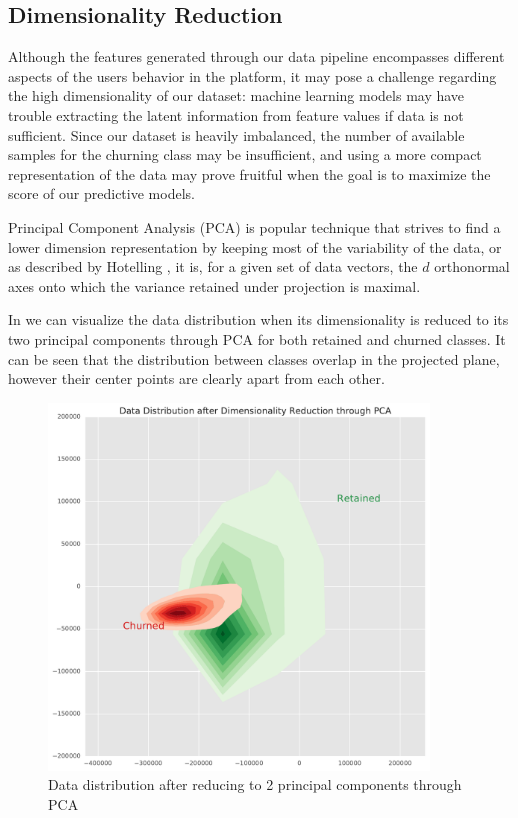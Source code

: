 \documentclass{kththesis}
\begin{document}
\subsection{Dimensionality Reduction}

Although the features generated through our data pipeline encompasses different aspects of the users behavior in the platform, it may pose a challenge regarding the high dimensionality of our dataset: machine learning models may have trouble extracting the latent information from feature values if data is not sufficient. Since our dataset is heavily imbalanced, the number of available samples for the churning class may be insufficient, and using a more compact representation of the data may prove fruitful when the goal is to maximize the score of our predictive models.

Principal Component Analysis (PCA) is popular technique that strives to find a lower dimension representation by keeping most of the variability of the data, or as described by Hotelling \citep{hotelling1933analysis}, it is, for a given set of data vectors, the $d$ orthonormal axes onto which the variance retained under projection is maximal.

In  we can visualize the data distribution when its dimensionality is reduced to its two principal components through PCA for both retained and churned classes. It can be seen that the distribution between classes overlap in the projected plane, however their center points are clearly apart from each other.

	\begin{figure}[h]
    \centering
    \includegraphics[width=0.9\textwidth,keepaspectratio]{figures/pca_data.pdf}
    \caption{Data distribution after reducing to 2 principal components through PCA}
    \label{fig:pca_data}
	\end{figure}
\end{document}
